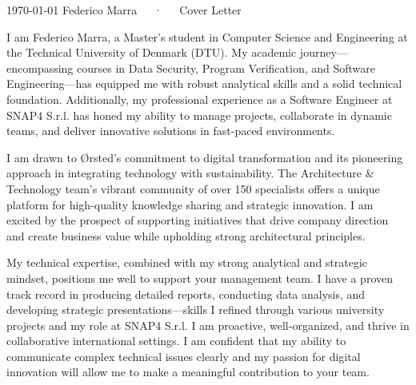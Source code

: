 \documentclass[11pt, a4paper]{awesome-cv}
\begin{document}
\makecvheader[R]

\makecvfooter
  {\today}
  {Federico Marra~~~·~~~Cover Letter}
  {}

\makelettertitle

\begin{cvletter}

I am Federico Marra, a Master’s student in Computer Science and Engineering at the Technical University of Denmark (DTU). My academic journey—encompassing courses in Data Security, Program Verification, and Software Engineering—has equipped me with robust analytical skills and a solid technical foundation. Additionally, my professional experience as a Software Engineer at SNAP4 S.r.l. has honed my ability to manage projects, collaborate in dynamic teams, and deliver innovative solutions in fast-paced environments.

I am drawn to Ørsted’s commitment to digital transformation and its pioneering approach in integrating technology with sustainability. The Architecture \& Technology team’s vibrant community of over 150 specialists offers a unique platform for high-quality knowledge sharing and strategic innovation. I am excited by the prospect of supporting initiatives that drive company direction and create business value while upholding strong architectural principles.

My technical expertise, combined with my strong analytical and strategic mindset, positions me well to support your management team. I have a proven track record in producing detailed reports, conducting data analysis, and developing strategic presentations—skills I refined through various university projects and my role at SNAP4 S.r.l. I am proactive, well-organized, and thrive in collaborative international settings. I am confident that my ability to communicate complex technical issues clearly and my passion for digital innovation will allow me to make a meaningful contribution to your team.

\end{cvletter}

\makeletterclosing
\end{document}
